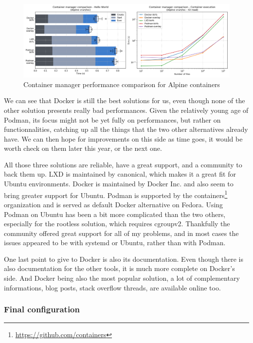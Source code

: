 \begin{figure}[h!]
  \begin{center}
    \includegraphics[width=\linewidth]{images/question-1-manager.png}
    \caption{Container manager performance comparison for Alpine containers}
    \label{fig:q1:manager}
  \end{center}
\end{figure}

We can see that Docker is still the best solutions for us, even though none of the other solution presents really bad performances.  Given the relatively young age of Podman, its focus might not be yet fully on performances, but rather on functionnalities, catching up all the things that the two other alternatives already have.  We can then hope for improvements on this side as time goes, it would be worth check on them later this year, or the next one.  

All those three solutions are reliable, have a great support, and a community to back them up.  LXD is maintained by canonical, which makes it a great fit for Ubuntu environments.  Docker is maintained by Docker Inc. and also seem to bring greater support for Ubuntu.  Podman is supported by the containers\footnote{\href{https://github.com/containers}{https://github.com/containers}} organization and is served as default Docker alternative on Fedora.  Using Podman on Ubuntu has been a bit more complicated than the two others, especially for the rootless solution, which requires cgroupv2.  Thankfully the community offered great support for all of my problems, and in most cases the issues appeared to be with systemd or Ubuntu, rather than with Podman.

One last point to give to Docker is also its documentation.  Even though there is also documentation for the other tools, it is much more complete on Docker's side.  And Docker being also the most popular solution, a lot of complementary informations, blog posts, stack overflow threads, are available online too.

\subsubsection{Final configuration}

